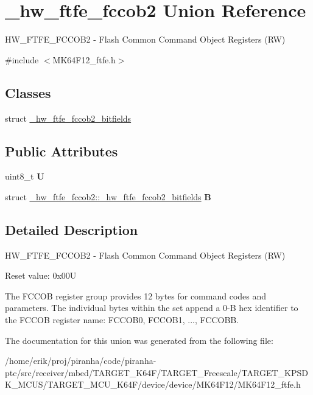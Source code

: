 \hypertarget{union__hw__ftfe__fccob2}{}\section{\+\_\+hw\+\_\+ftfe\+\_\+fccob2 Union Reference}
\label{union__hw__ftfe__fccob2}


H\+W\+\_\+\+F\+T\+F\+E\+\_\+\+F\+C\+C\+O\+B2 -\/ Flash Common Command Object Registers (RW)  




{\ttfamily \#include $<$M\+K64\+F12\+\_\+ftfe.\+h$>$}

\subsection*{Classes}
\begin{DoxyCompactItemize}
\item 
struct \hyperlink{struct__hw__ftfe__fccob2_1_1__hw__ftfe__fccob2__bitfields}{\+\_\+hw\+\_\+ftfe\+\_\+fccob2\+\_\+bitfields}
\end{DoxyCompactItemize}
\subsection*{Public Attributes}
\begin{DoxyCompactItemize}
\item 
uint8\+\_\+t {\bfseries U}\hypertarget{union__hw__ftfe__fccob2_a733dfdabea6e179ae742877a9fc136ff}{}\label{union__hw__ftfe__fccob2_a733dfdabea6e179ae742877a9fc136ff}

\item 
struct \hyperlink{struct__hw__ftfe__fccob2_1_1__hw__ftfe__fccob2__bitfields}{\+\_\+hw\+\_\+ftfe\+\_\+fccob2\+::\+\_\+hw\+\_\+ftfe\+\_\+fccob2\+\_\+bitfields} {\bfseries B}\hypertarget{union__hw__ftfe__fccob2_a2c329302ab2404d7986a3dc3528d4530}{}\label{union__hw__ftfe__fccob2_a2c329302ab2404d7986a3dc3528d4530}

\end{DoxyCompactItemize}


\subsection{Detailed Description}
H\+W\+\_\+\+F\+T\+F\+E\+\_\+\+F\+C\+C\+O\+B2 -\/ Flash Common Command Object Registers (RW) 

Reset value\+: 0x00U

The F\+C\+C\+OB register group provides 12 bytes for command codes and parameters. The individual bytes within the set append a 0-\/B hex identifier to the F\+C\+C\+OB register name\+: F\+C\+C\+O\+B0, F\+C\+C\+O\+B1, ..., F\+C\+C\+O\+BB. 

The documentation for this union was generated from the following file\+:\begin{DoxyCompactItemize}
\item 
/home/erik/proj/piranha/code/piranha-\/ptc/src/receiver/mbed/\+T\+A\+R\+G\+E\+T\+\_\+\+K64\+F/\+T\+A\+R\+G\+E\+T\+\_\+\+Freescale/\+T\+A\+R\+G\+E\+T\+\_\+\+K\+P\+S\+D\+K\+\_\+\+M\+C\+U\+S/\+T\+A\+R\+G\+E\+T\+\_\+\+M\+C\+U\+\_\+\+K64\+F/device/device/\+M\+K64\+F12/M\+K64\+F12\+\_\+ftfe.\+h\end{DoxyCompactItemize}

